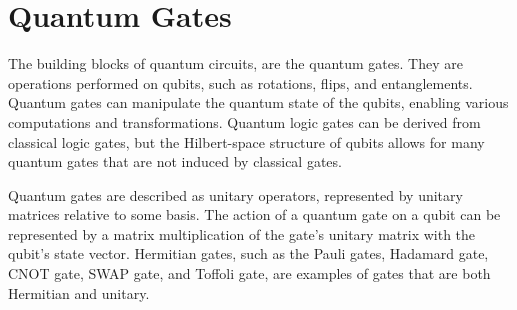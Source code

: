 \documentclass[inscr,ack,preface]{diphdthesis}
\begin{document}
\cite{kockum2014quantum}


\section{Quantum Gates}

The building blocks of quantum circuits, are the quantum gates. They are operations performed on qubits, such as rotations, flips, and entanglements. Quantum gates can manipulate the quantum state of the qubits, enabling various computations and transformations. Quantum logic gates can be derived from classical logic gates, but the Hilbert-space structure of qubits allows for many quantum gates that are not induced by classical gates.

Quantum gates are described as unitary operators, represented by unitary matrices relative to some basis. The action of a quantum gate on a qubit can be represented by a matrix multiplication of the gate's unitary matrix with the qubit's state vector. Hermitian gates, such as the Pauli gates, Hadamard gate, CNOT gate, SWAP gate, and Toffoli gate, are examples of gates that are both Hermitian and unitary.
\end{document}
